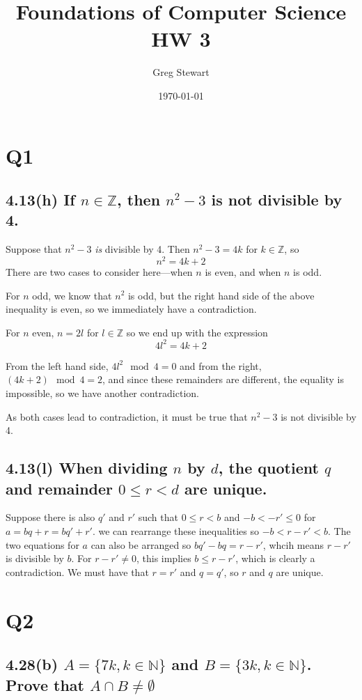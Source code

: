 \documentclass{article}
\title{Foundations of Computer Science HW 3}
\author{Greg Stewart}
\date{\today}
\begin{document}
\maketitle

\section*{Q1} %
\subsection*{4.13(h) \normalsize If $n \in \mathbb{Z}$, then $n^2 - 3$ is not divisible by 4.}

Suppose that $n^2 -3$ \textit{is} divisible by 4. Then $n^2 - 3 = 4k$ for $k \in \mathbb{Z}$, so $$n^2 = 4k + 2$$ There are two cases to consider here---when $n$ is even, and when $n$ is odd.

For $n$ odd, we know that $n^2$ is odd, but the right hand side of the above inequality is even, so we immediately have a contradiction.

For $n$ even, $n = 2l$ for $l \in \mathbb{Z}$ so we end up with the expression $$4l^2 = 4k + 2$$

From the left hand side, $4l^2 \mod 4 = 0$ and from the right, $(4k+2)\mod 4 = 2$, and since these remainders are different, the equality is impossible, so we have another contradiction.

As both cases lead to contradiction, it must be true that $n^2 -3$ is not divisible by 4.

\subsection*{4.13(l) \normalsize When dividing $n$ by $d$, the quotient $q$ and remainder $0 \leq r < d$ are unique.}

Suppose there is also $q'$ and $r'$ such that $0 \leq r < b$ and $-b < -r' \leq 0$ for $a = bq + r = bq' + r'$. we can rearrange these inequalities so $-b < r-r' < b$. The two equations for $a$ can also be arranged so $bq' - bq = r-r'$, whcih means $r - r'$ is divisible by $b$. For $r-r' \neq 0$, this implies $b \leq r-r'$, which is clearly a contradiction. We must have that $r = r'$ and $q = q'$, so $r$ and $q$ are unique.


\section*{Q2} %
\subsection*{4.28(b) \normalsize $A = \{7k, k \in \mathbb{N}\}$ and $B = \{3k, k \in \mathbb{N}\}$. Prove that $A \cap B \neq \emptyset$}
\end{document}
